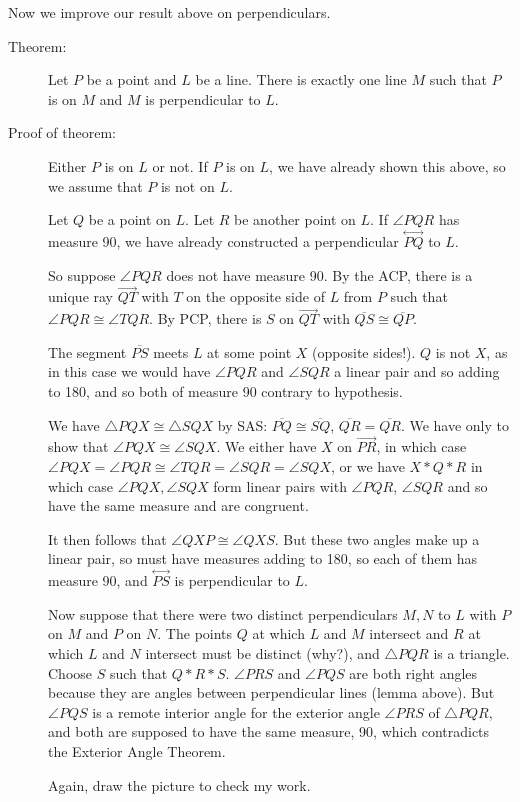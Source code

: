 \documentclass[12pt]{article}
\newcommand\Line[1]{\overset{\leftrightarrow}{#1}}
\begin{document}
Now we improve our result above on perpendiculars.

\begin{description}

\item[Theorem:]  Let $P$ be a point and $L$ be a line.  There is exactly one line $M$ such that $P$ is on $M$ and $M$ is perpendicular to $L$.

\item[Proof of theorem:]  Either $P$ is on $L$ or not.  If $P$ is on $L$, we have already shown this above, so we assume that $P$ is not on $L$.

Let $Q$ be a point on $L$.  Let $R$ be another point on $L$.  If $\angle PQR$ has measure 90, we have already constructed a perpendicular $\Line{PQ}$ to $L$.

So suppose $\angle PQR$ does not have measure 90.  By the ACP, there is a unique ray $\overrightarrow{QT}$ with $T$ on the opposite side of $L$ from $P$ such that $\angle PQR \cong \angle TQR$.  By PCP, there is $S$ on $\overrightarrow {QT}$ with $\overline{QS} \cong \overline{QP}$.

The segment $\overline{PS}$ meets $L$ at some point $X$ (opposite sides!).  $Q$ is not $X$, as in this case we would have $\angle PQR$ and $\angle SQR$ a linear pair
and so adding to 180, and so both of measure 90 contrary to hypothesis.

We have $\triangle PQX \cong \triangle SQX$ by SAS: $\overline{PQ} \cong \overline{SQ}$, $\overline{QR} =\overline{QR}$.  We have only to show that
$\angle PQX \cong \angle SQX$.    We either have $X$ on $\overrightarrow{PR}$, in which case $\angle PQX = \angle PQR \cong \angle TQR = \angle SQR = \angle SQX$,
or we have $X*Q*R$ in which case $\angle PQX, \angle SQX$ form linear pairs with $\angle PQR$, $\angle SQR$ and so have the same measure and are congruent.

It then follows that $\angle QXP \cong \angle QXS$.  But these two angles make up a linear pair, so must have measures adding to 180, so each of them has measure 90,
and $\Line{PS}$ is perpendicular to $L$.

Now suppose that there were two distinct perpendiculars $M,N$ to $L$ with $P$ on $M$ and $P$ on $N$.  The points $Q$ at which $L$ and $M$ intersect and $R$ at which $L$ and $N$ intersect must be distinct (why?), and $\triangle PQR$ is a triangle.  Choose $S$ such that $Q*R*S$.  $\angle PRS$ and $\angle PQS$ are both right angles because they are angles
between perpendicular lines (lemma above).  But $\angle PQS$ is a remote interior angle for the exterior angle $\angle PRS$ of $\triangle PQR$, and both are supposed to have the same measure, 90, which contradicts the Exterior Angle Theorem.

Again, draw the picture to check my work.

\end{description}
\end{document}
